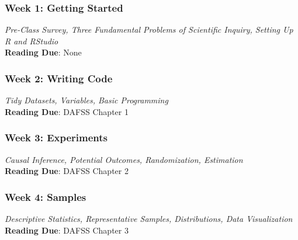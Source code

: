 \documentclass[11pt, letterpaper]{article}
\begin{document}


\subsubsection*{Week 1: Getting Started}
\textit{Pre-Class Survey, Three Fundamental Problems of Scientific Inquiry, Setting Up R and RStudio}\\
\textbf{Reading Due}: None

\subsubsection*{Week 2: Writing Code}
\textit{Tidy Datasets, Variables, Basic Programming}\\
\textbf{Reading Due}: DAFSS Chapter 1

\subsubsection*{Week 3: Experiments}
\textit{Causal Inference, Potential Outcomes, Randomization, Estimation}\\
\textbf{Reading Due}: DAFSS Chapter 2

\subsubsection*{Week 4: Samples}
\textit{Descriptive Statistics, Representative Samples, Distributions, Data Visualization}\\
\textbf{Reading Due}: DAFSS Chapter 3
\end{document}
